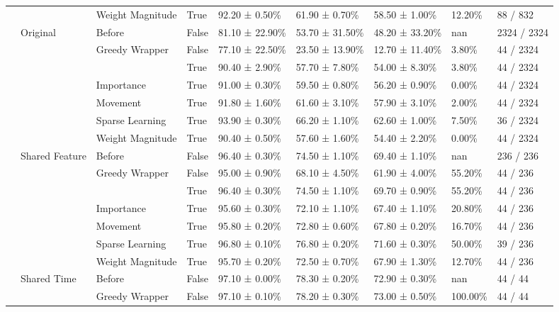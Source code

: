 \begin{tabular}{lllllllll}
\cline{3-9}
 &  & Weight Magnitude & True & 92.20 ± 0.50\% & 61.90 ± 0.70\% & 58.50 ± 1.00\% & 12.20\% & 88 / 832 \\
\cline{2-9} \cline{3-9}
 & \multirow[t]{7}{*}{Original} & Before & False & 81.10 ± 22.90\% & 53.70 ± 31.50\% & 48.20 ± 33.20\% & nan & 2324 / 2324 \\
\cline{3-9}
 &  & \multirow[t]{2}{*}{Greedy Wrapper} & False & 77.10 ± 22.50\% & 23.50 ± 13.90\% & 12.70 ± 11.40\% & 3.80\% & 44 / 2324 \\
 &  &  & True & 90.40 ± 2.90\% & 57.70 ± 7.80\% & 54.00 ± 8.30\% & 3.80\% & 44 / 2324 \\
\cline{3-9}
 &  & Importance & True & 91.00 ± 0.30\% & 59.50 ± 0.80\% & 56.20 ± 0.90\% & 0.00\% & 44 / 2324 \\
\cline{3-9}
 &  & Movement & True & 91.80 ± 1.60\% & 61.60 ± 3.10\% & 57.90 ± 3.10\% & 2.00\% & 44 / 2324 \\
\cline{3-9}
 &  & Sparse Learning & True & 93.90 ± 0.30\% & 66.20 ± 1.10\% & 62.60 ± 1.00\% & 7.50\% & 36 / 2324 \\
\cline{3-9}
 &  & Weight Magnitude & True & 90.40 ± 0.50\% & 57.60 ± 1.60\% & 54.40 ± 2.20\% & 0.00\% & 44 / 2324 \\
\cline{2-9} \cline{3-9}
 & \multirow[t]{7}{*}{Shared Feature} & Before & False & 96.40 ± 0.30\% & 74.50 ± 1.10\% & 69.40 ± 1.10\% & nan & 236 / 236 \\
\cline{3-9}
 &  & \multirow[t]{2}{*}{Greedy Wrapper} & False & 95.00 ± 0.90\% & 68.10 ± 4.50\% & 61.90 ± 4.00\% & 55.20\% & 44 / 236 \\
 &  &  & True & 96.40 ± 0.30\% & 74.50 ± 1.10\% & 69.70 ± 0.90\% & 55.20\% & 44 / 236 \\
\cline{3-9}
 &  & Importance & True & 95.60 ± 0.30\% & 72.10 ± 1.10\% & 67.40 ± 1.10\% & 20.80\% & 44 / 236 \\
\cline{3-9}
 &  & Movement & True & 95.80 ± 0.20\% & 72.80 ± 0.60\% & 67.80 ± 0.20\% & 16.70\% & 44 / 236 \\
\cline{3-9}
 &  & Sparse Learning & True & 96.80 ± 0.10\% & 76.80 ± 0.20\% & 71.60 ± 0.30\% & 50.00\% & 39 / 236 \\
\cline{3-9}
 &  & Weight Magnitude & True & 95.70 ± 0.20\% & 72.50 ± 0.70\% & 67.90 ± 1.30\% & 12.70\% & 44 / 236 \\
\cline{2-9} \cline{3-9}
 & \multirow[t]{7}{*}{Shared Time} & Before & False & 97.10 ± 0.00\% & 78.30 ± 0.20\% & 72.90 ± 0.30\% & nan & 44 / 44 \\
\cline{3-9}
 &  & \multirow[t]{2}{*}{Greedy Wrapper} & False & 97.10 ± 0.10\% & 78.20 ± 0.30\% & 73.00 ± 0.50\% & 100.00\% & 44 / 44 \\

\end{tabular}
